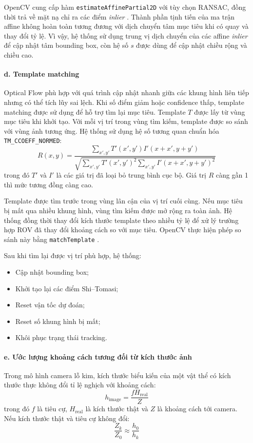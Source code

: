 \documentclass[../DoAn.tex]{subfiles}
\begin{document}
OpenCV cung cấp hàm \texttt{estimateAffinePartial2D} với tùy chọn RANSAC, đồng thời trả về mặt nạ chỉ ra các điểm \textit{inlier} \cite{opencv_calib3d}. Thành phần tịnh tiến của ma trận affine không hoàn toàn tương đương với dịch chuyển tâm mục tiêu khi có quay và thay đổi tỷ lệ. Vì vậy, hệ thống sử dụng trung vị dịch chuyển của các affine \textit{inlier} để cập nhật tâm bounding box, còn hệ số $s$ được dùng để cập nhật chiều rộng và chiều cao.

\paragraph{d. Template matching}
Optical Flow phù hợp với quá trình cập nhật nhanh giữa các khung hình liên tiếp nhưng có thể tích lũy sai lệch. Khi số điểm giảm hoặc confidence thấp, template matching được sử dụng để hỗ trợ tìm lại mục tiêu. Template $T$ được lấy từ vùng mục tiêu khi khởi tạo. Với mỗi vị trí trong vùng tìm kiếm, template được so sánh với vùng ảnh tương ứng. Hệ thống sử dụng hệ số tương quan chuẩn hóa \texttt{TM\_CCOEFF\_NORMED}:
\[
R(x, y) = \frac{\displaystyle\sum_{x',y'} T'(x',y')I'(x+x',y+y')}{\sqrt{\displaystyle\sum_{x',y'} T'(x',y')^2 \sum_{x',y'} I'(x+x',y+y')^2}}
\]
trong đó $T'$ và $I'$ là các giá trị đã loại bỏ trung bình cục bộ. Giá trị $R$ càng gần 1 thì mức tương đồng càng cao.

Template được tìm trước trong vùng lân cận của vị trí cuối cùng. Nếu mục tiêu bị mất qua nhiều khung hình, vùng tìm kiếm được mở rộng ra toàn ảnh. Hệ thống đồng thời thay đổi kích thước template theo nhiều tỷ lệ để xử lý trường hợp ROV đã thay đổi khoảng cách so với mục tiêu. OpenCV thực hiện phép so sánh này bằng \texttt{matchTemplate} \cite{opencv_template_matching}.

Sau khi tìm lại được vị trí phù hợp, hệ thống:
\begin{itemize}
    \item Cập nhật bounding box;
    \item Khởi tạo lại các điểm Shi--Tomasi;
    \item Reset vận tốc dự đoán;
    \item Reset số khung hình bị mất;
    \item Khôi phục trạng thái tracking.
\end{itemize}

\paragraph{e. Ước lượng khoảng cách tương đối từ kích thước ảnh}
Trong mô hình camera lỗ kim, kích thước biểu kiến của một vật thể có kích thước thực không đổi tỉ lệ nghịch với khoảng cách:
\[
h_{\mathrm{image}} = \frac{f H_{\mathrm{real}}}{Z}
\]
trong đó $f$ là tiêu cự, $H_{\mathrm{real}}$ là kích thước thật và $Z$ là khoảng cách tới camera. Nếu kích thước thật và tiêu cự không đổi:
\[
\frac{Z_k}{Z_0} \approx \frac{h_0}{h_k}
\]
\end{document}
